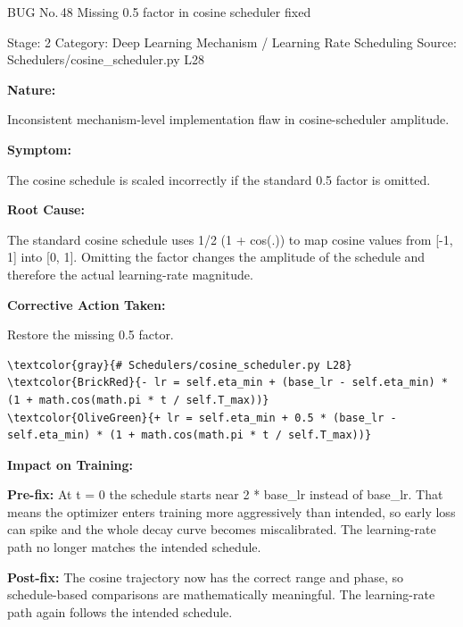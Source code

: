 \documentclass[10pt]{article}
\newcommand{\FieldLabel}[1]{%
 {\bfseries #1:}\par
}
\begin{document}
\begin{bugbox}{BUG No.\,48 \quad Missing 0.5 factor in cosine scheduler fixed}
{\color{MetaGray}\small Stage: 2 \;\textbar\; Category: Deep Learning Mechanism / Learning Rate Scheduling \;\textbar\; Source: Schedulers/cosine\_scheduler.py L28\par}
\vspace{0.22em}
\FieldLabel{Nature}
Inconsistent mechanism-level implementation flaw in cosine-scheduler amplitude.
\par
\vspace{0.35em}
\FieldLabel{Symptom}
The cosine schedule is scaled incorrectly if the standard 0.5 factor is omitted.
\par
\vspace{0.35em}
\FieldLabel{Root Cause}
The standard cosine schedule uses 1/2 (1 + cos(.)) to map cosine values from {[}-1, 1{]} into {[}0, 1{]}. Omitting the factor changes the amplitude of the schedule and therefore the actual learning-rate magnitude.
\par
\vspace{0.35em}
\FieldLabel{Corrective Action Taken}
Restore the missing 0.5 factor.
\par
\vspace{0.35em}
\begin{Verbatim}[commandchars=\\\{\},fontsize=\footnotesize,breaklines=true,breaksymbol={},frame=leftline,framerule=2pt,rulecolor=\color{gray!40},xleftmargin=6pt,formatcom=\singlespacing]
\textcolor{gray}{# Schedulers/cosine_scheduler.py L28}
\textcolor{BrickRed}{- lr = self.eta_min + (base_lr - self.eta_min) * (1 + math.cos(math.pi * t / self.T_max))}
\textcolor{OliveGreen}{+ lr = self.eta_min + 0.5 * (base_lr - self.eta_min) * (1 + math.cos(math.pi * t / self.T_max))}
\end{Verbatim}
\vspace{0.22em}
\FieldLabel{Impact on Training}
\textbf{Pre-fix:} At t = 0 the schedule starts near 2 * base\_lr instead of base\_lr. That means the optimizer enters training more aggressively than intended, so early loss can spike and the whole decay curve becomes miscalibrated. The learning-rate path no longer matches the intended schedule. \par\smallskip
\textbf{Post-fix:} The cosine trajectory now has the correct range and phase, so schedule-based comparisons are mathematically meaningful. The learning-rate path again follows the intended schedule. 
\par
\vspace{0.35em}
\end{bugbox}
\end{document}
